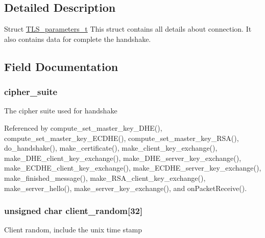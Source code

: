\subsection{Detailed Description}
Struct \hyperlink{struct_t_l_s__parameters__t}{T\+L\+S\+\_\+parameters\+\_\+t} This struct contains all details about connection. It also contains data for complete the handshake. 

\subsection{Field Documentation}
\subsubsection[{\texorpdfstring{cipher\+\_\+suite}{cipher_suite}}]{ cipher\+\_\+suite}\hypertarget{struct_t_l_s__parameters__t_af1d8ebe57a775be2b91550dbcacb2a58}{}\label{struct_t_l_s__parameters__t_af1d8ebe57a775be2b91550dbcacb2a58}
The cipher suite used for handshake 

Referenced by compute\+\_\+set\+\_\+master\+\_\+key\+\_\+\+D\+H\+E(), compute\+\_\+set\+\_\+master\+\_\+key\+\_\+\+E\+C\+D\+H\+E(), compute\+\_\+set\+\_\+master\+\_\+key\+\_\+\+R\+S\+A(), do\+\_\+handshake(), make\+\_\+certificate(), make\+\_\+client\+\_\+key\+\_\+exchange(), make\+\_\+\+D\+H\+E\+\_\+client\+\_\+key\+\_\+exchange(), make\+\_\+\+D\+H\+E\+\_\+server\+\_\+key\+\_\+exchange(), make\+\_\+\+E\+C\+D\+H\+E\+\_\+client\+\_\+key\+\_\+exchange(), make\+\_\+\+E\+C\+D\+H\+E\+\_\+server\+\_\+key\+\_\+exchange(), make\+\_\+finished\+\_\+message(), make\+\_\+\+R\+S\+A\+\_\+client\+\_\+key\+\_\+exchange(), make\+\_\+server\+\_\+hello(), make\+\_\+server\+\_\+key\+\_\+exchange(), and on\+Packet\+Receive().

\subsubsection[{\texorpdfstring{client\+\_\+random}{client_random}}]{\setlength{\rightskip}{0pt plus 5cm}unsigned char client\+\_\+random\mbox{[}32\mbox{]}}\hypertarget{struct_t_l_s__parameters__t_adbdca8d573a8e073ef16bf14229fb4c9}{}\label{struct_t_l_s__parameters__t_adbdca8d573a8e073ef16bf14229fb4c9}
Client random, include the unix time stamp 

